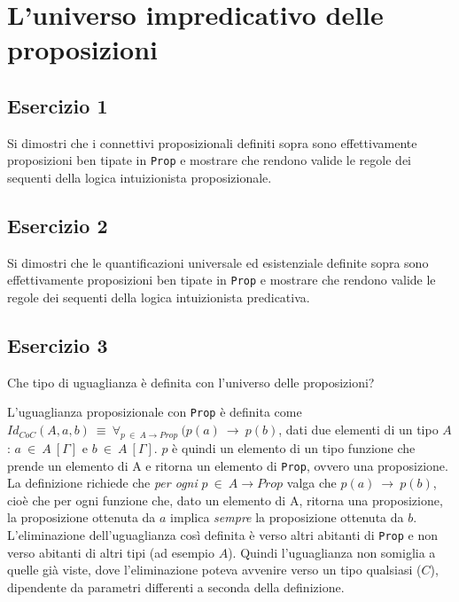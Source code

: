 \section{L'universo impredicativo delle proposizioni}
\subsection{Esercizio 1}
\begin{thm}
	Si dimostri che i connettivi proposizionali definiti sopra sono effettivamente proposizioni ben tipate in \texttt{Prop} e mostrare che rendono valide le regole dei sequenti della logica intuizionista proposizionale.
\end{thm}


\subsection{Esercizio 2}
\begin{thm}
	Si dimostri che le quantificazioni universale ed esistenziale definite sopra sono effettivamente proposizioni ben tipate in \texttt{Prop} e mostrare che rendono valide le regole dei sequenti della logica intuizionista predicativa.
\end{thm}


\subsection{Esercizio 3}
\begin{thm}
	Che tipo di uguaglianza è definita con l'universo delle proposizioni?
\end{thm}
L'uguaglianza proposizionale con \texttt{Prop} è definita come $Id_{CoC}(A,a,b)~\equiv~\forall_{p~\in~A\to Prop}~(p(a)~\to~p(b)$, dati due  elementi di un tipo $A$: $a~\in~A~[\Gamma]$ e $b~\in~A~[\Gamma]$. $p$ è quindi un elemento di un tipo funzione che prende un elemento di A e ritorna un elemento di \texttt{Prop}, ovvero una proposizione. La definizione richiede che \textit{per ogni} $p~\in~A\to Prop$ valga che $p(a)~\to~p(b)$, cioè che per ogni funzione che, dato un elemento di A, ritorna una proposizione, la proposizione ottenuta da $a$ implica \textit{sempre} la proposizione ottenuta da $b$. L'eliminazione dell'uguaglianza così definita è verso altri abitanti di \texttt{Prop} e non verso abitanti di altri tipi (ad esempio $A$). Quindi l'uguaglianza non somiglia a quelle già viste, dove l'eliminazione poteva avvenire verso un tipo qualsiasi ($C$), dipendente da parametri differenti a seconda della definizione.


